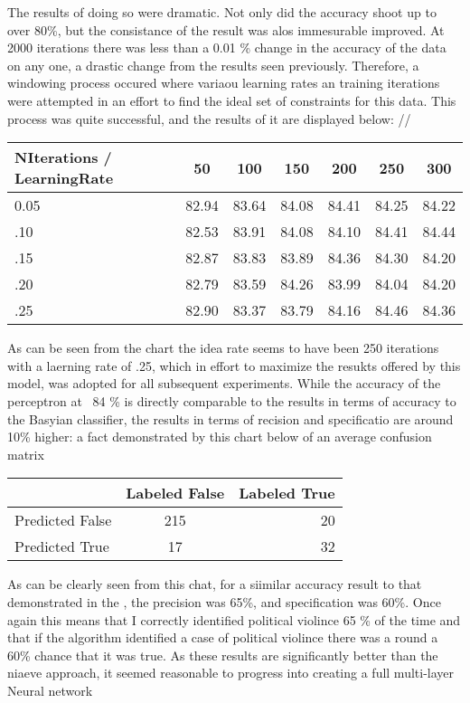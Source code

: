 \documentclass[12pt]{article}
\begin{document}
	The results of doing so were dramatic. Not only did the accuracy shoot up to over 80\%, but the consistance of the result was alos immesurable improved. At 2000 iterations there was less than a 0.01 \% change in the accuracy of the data on any one, a drastic change from the results seen previously. Therefore, a windowing process occured where variaou learning rates an training iterations were attempted in an effort to find the ideal set of constraints for this data. This process was quite successful, and the results of it are displayed below: //


\begin{center}
\begin{tabular}{l|cccccc}
NIterations / LearningRate & 50 & 100 & 150 & 200 & 250 & 300 \\
\hline
0.05 & 82.94 &  83.64 & 84.08 & 84.41 & 84.25 & 84.22 \\
 .10 & 82.53 &  83.91 & 84.08 & 84.10 & 84.41 & 84.44 \\
 .15 & 82.87 &  83.83 & 83.89 & 84.36 & 84.30 & 84.20 \\
 .20 & 82.79 &  83.59 & 84.26 & 83.99 & 84.04 & 84.20 \\
 .25 & 82.90 &  83.37 & 83.79 & 84.16 & 84.46 & 84.36 
\end{tabular}
\end{center}

	As can be seen from the chart the idea rate seems to have been 250 iterations with a laerning rate of .25, which in effort to maximize the resukts offered by this model, was adopted for all subsequent experiments. While the accuracy of the perceptron at ~84 \% is directly comparable to the results in terms of accuracy to the Basyian classifier, the results in terms of recision and specificatio are around 10\% higher: a fact demonstrated by this chart below of an average confusion matrix

\begin{center}
\begin{tabular}{l|c|r}
 & Labeled False & Labeled True\\
\hline
Predicted False & 215 & 20 \\
Predicted True & 17 & 32
\end{tabular}
\end{center}

	As can be clearly seen from this chat, for a siimilar accuracy result to that demonstrated in the , the precision was 65\%, and specification was 60\%. Once again this means that I correctly identified political violince 65 \% of the time and that if the algorithm identified a case of political violince there was a round a 60\% chance that it was true. As these results are significantly better than the niaeve approach, it seemed reasonable to progress into creating a full multi-layer Neural network 
\end{document}
